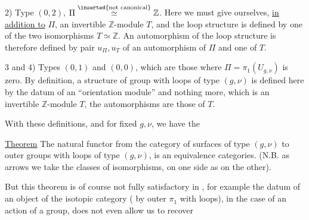 2) Type $(0,2)$, $\Pi\overset{\inserted{\text{not canonical}}}{\simeq}\mathbb{Z}$. Here we must give ourselves, \uline{in addition to} $\Pi$, an invertible $\mathbb{Z}$-module $T$, and the loop structure is defined by one of the two isomorphisms $T\simeq\mathbb{Z}$. An automorphism of the loop structure is therefore defined by   pair  $u_{\Pi},u_T$ of an automorphism of $\Pi$ and one of $T$.

3 and 4) Types $(0,1)$ and $(0,0)$, which are those where $\Pi=\pi_1(U_{g,\nu})$ is zero. By definition, a structure of group with loops of type $(g,\nu)$ is defined here by the datum of an ``orientation module'' and nothing more, which is an invertible $\mathbb{Z}$-module $T$, the automorphisms are those of $T$.

With these definitions, and for fixed $g,\nu$, we have the

\uline{Theorem}  The natural functor from the  category of surfaces of type $(g,\nu)$ to   outer groups with loops of type $(g,\nu)$, is an equivalence  categories. (N.B. as arrows we take the classes of isomorphisms, on one side as on the other).

But this theorem is of course not fully satisfactory in , for example the datum of an object of the isotopic category ( by  outer $\pi_1$ with loops), in the case of an action of a group, does not even allow us to recover
